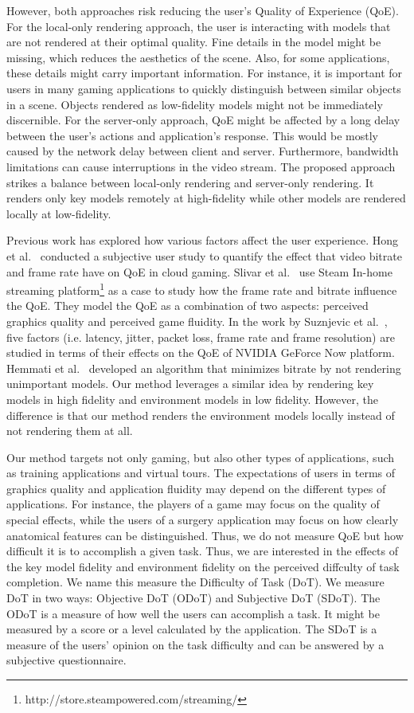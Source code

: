 However, both approaches risk reducing the user's Quality of Experience (QoE). For the local-only rendering approach, the user is interacting with models that are not rendered at their optimal quality. Fine details in the model might be missing, which reduces the aesthetics of the scene. Also, for some applications, these details might carry important information. For instance, it is important for users in many gaming applications to quickly distinguish between similar objects in a scene. Objects rendered as low-fidelity models might not be immediately discernible. For the server-only approach, QoE might be affected by a long delay between the user's actions and application's response. This would be mostly caused by the network delay between client and server. Furthermore, bandwidth limitations can cause interruptions in the video stream.
The proposed approach strikes a balance between local-only rendering and server-only rendering. It renders only key models remotely at high-fidelity while other models are rendered locally at low-fidelity. 

Previous work has explored how various factors affect the user experience. Hong et al.~\cite{hong2015user-study} conducted a subjective user study to quantify the effect that video bitrate and frame rate have on QoE in cloud gaming.
Slivar et al.~\cite{slivar2015qoe} use Steam In-home streaming platform\footnote{http://store.steampowered.com/streaming/} as a case to study how the frame rate and bitrate influence the QoE. They model the QoE as a combination of two aspects: perceived graphics quality and perceived game fluidity.
In the work by Suznjevic et al.~\cite{suznjevic2016}, five factors (i.e. latency, jitter, packet loss, frame rate and frame resolution) are studied in terms of their effects on the QoE of NVIDIA GeForce Now platform.
Hemmati et al.~\cite{hemmati2013bitrate} developed an algorithm that minimizes bitrate by not rendering unimportant models. Our method leverages a similar idea by rendering key models in high fidelity and environment models in low fidelity. However, the difference is that our method renders the environment models locally instead of not rendering them at all.

Our method targets not only gaming, but also other types of applications, such as training applications and virtual tours. The expectations of users in terms of graphics quality and application fluidity may depend on the different types of applications. For instance, the players of a game may focus on the quality of special effects, while the users of a surgery application may focus on how clearly anatomical features can be distinguished. Thus, we do not measure QoE but how difficult it is to accomplish a given task. Thus, we are interested in the effects of the key model fidelity and environment fidelity on the perceived diffculty of task completion. We name this measure the Difficulty of Task (DoT). We measure DoT in two ways: Objective DoT (ODoT) and Subjective DoT (SDoT).
The ODoT is a measure of how well the users can accomplish a task. It might be measured by a score or a level calculated by the application.
The SDoT is a measure of the users' opinion on the task difficulty and can be answered by a subjective questionnaire.


